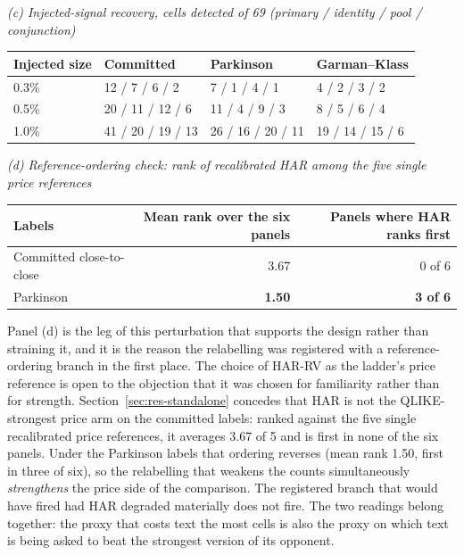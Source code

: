 \begin{table}[htbp]
\vspace{1.2ex}
\emph{(c) Injected-signal recovery, cells detected of 69 (primary / identity / pool / conjunction)}\\[0.4ex]
\begin{tabular}{@{}llll@{}}
\toprule
Injected size & Committed & Parkinson & Garman--Klass \\
\midrule
0.3\% & 12 / 7 / 6 / 2    & 7 / 1 / 4 / 1    & 4 / 2 / 3 / 2 \\
0.5\% & 20 / 11 / 12 / 6  & 11 / 4 / 9 / 3   & 8 / 5 / 6 / 4 \\
1.0\% & 41 / 20 / 19 / 13 & 26 / 16 / 20 / 11 & 19 / 14 / 15 / 6 \\
\bottomrule
\end{tabular}

\vspace{1.2ex}
\emph{(d) Reference-ordering check: rank of recalibrated HAR among the five single price references}\\[0.4ex]
\begin{tabular}{@{}lrr@{}}
\toprule
Labels & Mean rank over the six panels & Panels where HAR ranks first \\
\midrule
Committed close-to-close & 3.67 & 0 of 6 \\
Parkinson                & \textbf{1.50} & \textbf{3 of 6} \\
\bottomrule
\end{tabular}
\end{table}

Panel (d) is the leg of this perturbation that supports the design rather
than straining it, and it is the reason the relabelling was registered with
a reference-ordering branch in the first place. The choice of HAR-RV as the
ladder's price reference is open to the objection that it was chosen for
familiarity rather than for strength. Section~\ref{sec:res-standalone}
concedes that HAR is not the QLIKE-strongest price arm on the committed
labels: ranked against the five single recalibrated price references, it
averages 3.67 of 5 and is first in none of the six panels. Under the
Parkinson labels that ordering reverses (mean rank 1.50, first in three
of six), so the relabelling that weakens the counts simultaneously
\emph{strengthens} the price side of the comparison. The registered
branch that would have fired had HAR degraded materially does not fire.
The two readings belong together: the proxy that costs text the most cells
is also the proxy on which text is being asked to beat the strongest
version of its opponent. %

